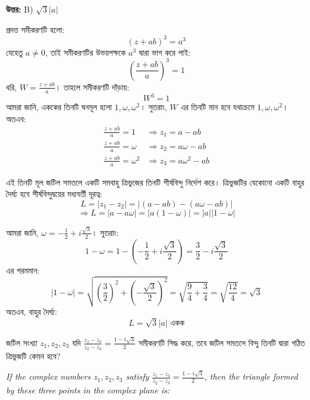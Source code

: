\documentclass[12pt, a4paper]{article}
\begin{document}
\vspace{0.5em}
\begin{tcolorbox}[answerbox]
    \textbf{\color{success} উত্তর:} B) $\sqrt{3} |a|$
\end{tcolorbox}
\vspace{1em}

\begin{tcolorbox}[solutionbox={সমাধান (Solution)}]
    \noindent
    প্রদত্ত সমীকরণটি হলো:
    \[ (z + ab)^3 = a^3 \]
    যেহেতু $a \neq 0$, তাই সমীকরণটির উভয়পক্ষকে $a^3$ দ্বারা ভাগ করে পাই:
    \[ \left(\frac{z + ab}{a}\right)^3 = 1 \]
    ধরি, $W = \frac{z + ab}{a}$। তাহলে সমীকরণটি দাঁড়ায়:
    \[ W^3 = 1 \]
    আমরা জানি, এককের তিনটি ঘনমূল হলো $1, \omega, \omega^2$। সুতরাং, $W$ এর তিনটি মান হবে যথাক্রমে $1, \omega, \omega^2$। অতএব:
    \begin{align*}
        \frac{z + ab}{a} = 1 &\Rightarrow z_1 = a - ab \\
        \frac{z + ab}{a} = \omega &\Rightarrow z_2 = a\omega - ab \\
        \frac{z + ab}{a} = \omega^2 &\Rightarrow z_3 = a\omega^2 - ab
    \end{align*}
    
    \vspace{0.5em}
    এই তিনটি মূল জটিল সমতলে একটি সমবাহু ত্রিভুজের তিনটি শীর্ষবিন্দু নির্দেশ করে। ত্রিভুজটির যেকোনো একটি বাহুর দৈর্ঘ্য হবে শীর্ষবিন্দুদ্বয়ের মধ্যবর্তী দূরত্ব:
    \[ L = |z_1 - z_2| = |(a - ab) - (a\omega - ab)| \]
    \[ \Rightarrow L = |a - a\omega| = |a(1 - \omega)| = |a| |1 - \omega| \]
    
    \vspace{0.5em}
    আমরা জানি, $\omega = -\frac{1}{2} + i\frac{\sqrt{3}}{2}$। সুতরাং:
    \[ 1 - \omega = 1 - \left(-\frac{1}{2} + i\frac{\sqrt{3}}{2}\right) = \frac{3}{2} - i\frac{\sqrt{3}}{2} \]
    এর পরমমান:
    \[ |1 - \omega| = \sqrt{\left(\frac{3}{2}\right)^2 + \left(-\frac{\sqrt{3}}{2}\right)^2} = \sqrt{\frac{9}{4} + \frac{3}{4}} = \sqrt{\frac{12}{4}} = \sqrt{3} \]
    অতএব, বাহুর দৈর্ঘ্য:
    \[ L = \sqrt{3} |a| \text{ একক} \]
\end{tcolorbox}

\begin{tcolorbox}[questionbox={প্রশ্ন (Question) 11}]
    \noindent
    জটিল সংখ্যা $z_1, z_2, z_3$ যদি $\frac{z_1 - z_3}{z_2 - z_3} = \frac{1 - i\sqrt{3}}{2}$ সমীকরণটি সিদ্ধ করে, তবে জটিল সমতলে বিন্দু তিনটি দ্বারা গঠিত ত্রিভুজটি কেমন হবে?
    
    \vspace{0.8em}
    \begin{english}
    \noindent\textit{\color{darkgray}
    If the complex numbers $z_1, z_2, z_3$ satisfy $\frac{z_1 - z_3}{z_2 - z_3} = \frac{1 - i\sqrt{3}}{2}$, then the triangle formed by these three points in the complex plane is:
    }
    \end{english}
\end{tcolorbox}
\end{document}

